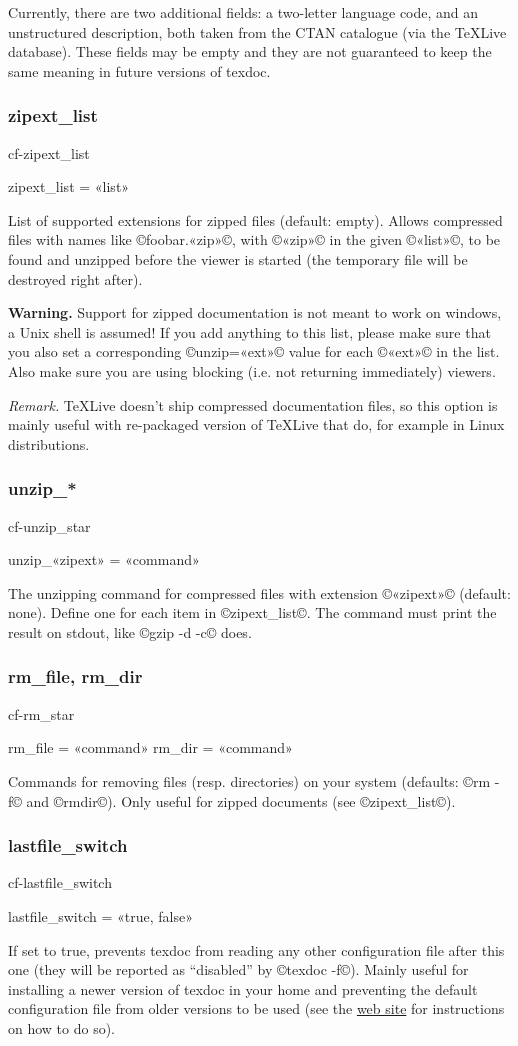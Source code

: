 \documentclass[a4paper, oneside]{scrartcl}
\newcommand\texlive{%
  \TeX\thinspace Live\xspace}
\newif\ifframed
\newenvironment{cmdsubsub}[2]{%
  \framedfalse \commandes\subsubsection{#1}{#2}%
  }{%
  \endcommandes}
\begin{document}
Currently, there are two additional fields: a two-letter language code, and an
unstructured description, both taken from the CTAN catalogue (via the \texlive
database). These fields may be empty and they are not guaranteed to keep the
same meaning in future versions of texdoc.

\begin{cmdsubsub}{zipext_list}{cf-zipext_list}
  zipext_list = «list»
\end{cmdsubsub}

List of supported extensions for zipped files (default: empty).  Allows
compressed files with names like ©foobar.«zip»©, with ©«zip»© in the given
©«list»©, to be found and unzipped before the viewer is started (the
temporary file will be destroyed right after).

\textbf{Warning.} Support for zipped documentation is not meant to work on
windows, a Unix shell is assumed! If you add anything to this list, please
make sure that you also set a corresponding ©unzip=«ext»© value for each
©«ext»© in the list. Also make sure you are using blocking (i.e. not returning
immediately) viewers.

\textit{Remark.} \texlive doesn't ship compressed documentation files, so
this option is mainly useful with re-packaged version of \texlive that do,
for example in Linux distributions.

\begin{cmdsubsub}{unzip_*}{cf-unzip_star}
  unzip_«zipext» = «command»
\end{cmdsubsub}

The unzipping command for compressed files with extension ©«zipext»© (default:
none). Define one for each item in ©zipext_list©. The command must print
the result on stdout, like ©gzip -d -c© does.

\begin{cmdsubsub}{rm_file, rm_dir}{cf-rm_star}
  rm_file = «command»
  rm_dir  = «command»
\end{cmdsubsub}

Commands for removing files (resp. directories) on your system (defaults:
©rm -f© and ©rmdir©). Only useful for zipped documents (see ©zipext_list©).

\begin{cmdsubsub}{lastfile_switch}{cf-lastfile_switch}
  lastfile_switch = «true, false»
\end{cmdsubsub}

If set to true, prevents texdoc from reading any other configuration file
after this one (they will be reported as ``disabled'' by ©texdoc -f©).  Mainly
useful for installing a newer version of texdoc in your home and preventing
the default configuration file from older versions to be used (see the
\href{http://tug.org/texdoc/}{web site} for instructions on how to do so).
\end{document}
